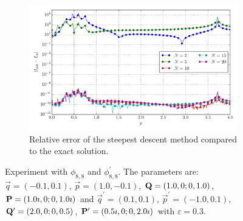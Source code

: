 \documentclass[a4paper,10pt]{article}
\begin{document}
\begin{figure}[ht!]
\begin{subfigure}[t]{0.5\linewidth}
    \includegraphics[width=\linewidth]{./plots/tp_2d_conv_p_(8,8)_(8,8)_err_rel_nsd.pdf}
    \caption{Relative error of the steepest descent method compared to the exact solution.}
    \label{fig:tp_2d_conv_p_88_88_err_nsd}
  \end{subfigure}
  \label{fig:tp_2d_conv_p_88_88}
  \caption{Experiment with $\phi_{8,8}$ and $\phi_{8,8}^{\prime}$.
  The parameters are:
  $\vec{q} = (-0.1,  0.1)$,
  $\vec{p} = ( 1.0, -0.1)$,
  $\mathbf{Q} = ( 1.0,       0; 0, 1.0)$,
  $\mathbf{P} = ( 1.0\imath, 0; 0, 1.0\imath)$
  and
  $\vec{q}^\prime = ( 0.1, 0.1)$,
  $\vec{p}^\prime = (-1.0, 0.1)$,
  $\mathbf{Q}^\prime = ( 2.0,       0; 0, 0.5)$,
  $\mathbf{P}^\prime = ( 0.5\imath, 0; 0, 2.0\imath)$
  with $\varepsilon=0.3$.}
\end{figure}
\end{document}
